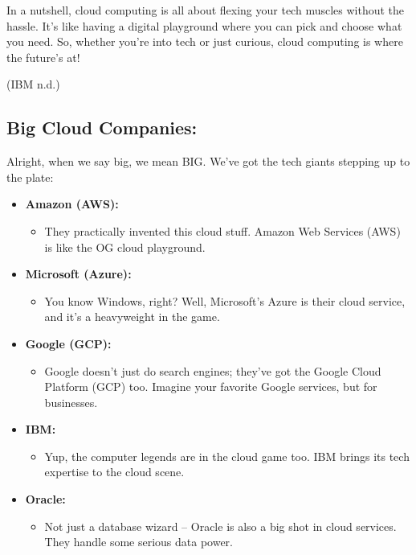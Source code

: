 \documentclass[
  letterpaper,
  DIV=11,
  numbers=noendperiod]{scrreprt}
\providecommand{\tightlist}{%
  \setlength{\itemsep}{0pt}\setlength{\parskip}{0pt}}\usepackage{longtable,booktabs,array}
\begin{document}
In a nutshell, cloud computing is all about flexing your tech muscles
without the hassle. It's like having a digital playground where you can
pick and choose what you need. So, whether you're into tech or just
curious, cloud computing is where the future's at!

(IBM n.d.)

\subsection{Big Cloud Companies:}\label{big-cloud-companies}

Alright, when we say big, we mean BIG. We've got the tech giants
stepping up to the plate:

\begin{itemize}
\item
  \textbf{Amazon (AWS):}

  \begin{itemize}
  \tightlist
  \item
    They practically invented this cloud stuff. Amazon Web Services
    (AWS) is like the OG cloud playground.
  \end{itemize}
\item
  \textbf{Microsoft (Azure):}

  \begin{itemize}
  \tightlist
  \item
    You know Windows, right? Well, Microsoft's Azure is their cloud
    service, and it's a heavyweight in the game.
  \end{itemize}
\item
  \textbf{Google (GCP):}

  \begin{itemize}
  \tightlist
  \item
    Google doesn't just do search engines; they've got the Google Cloud
    Platform (GCP) too. Imagine your favorite Google services, but for
    businesses.
  \end{itemize}
\item
  \textbf{IBM:}

  \begin{itemize}
  \tightlist
  \item
    Yup, the computer legends are in the cloud game too. IBM brings its
    tech expertise to the cloud scene.
  \end{itemize}
\item
  \textbf{Oracle:}

  \begin{itemize}
  \tightlist
  \item
    Not just a database wizard -- Oracle is also a big shot in cloud
    services. They handle some serious data power.
  \end{itemize}
\end{itemize}
\end{document}
